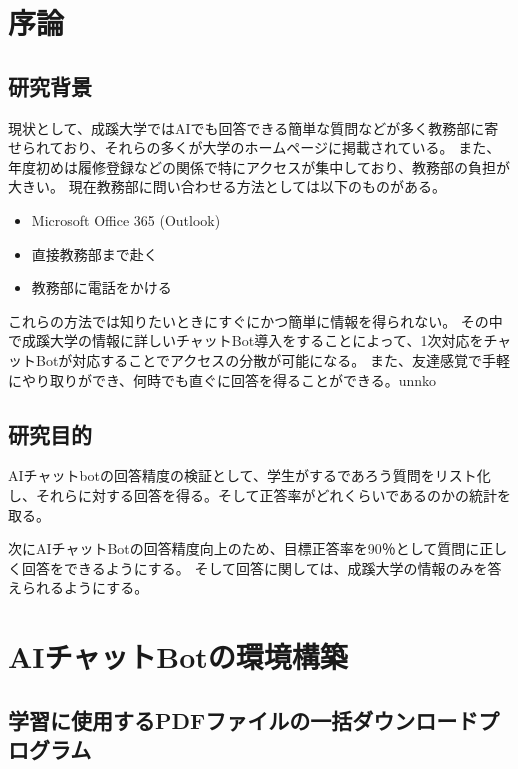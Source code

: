 \documentclass[report]{jlreq}
\begin{document}
	\chapter{序論}
		\section{研究背景}
			現状として、成蹊大学ではAIでも回答できる簡単な質問などが多く教務部に寄せられており、それらの多くが大学のホームページに掲載されている。
			また、年度初めは履修登録などの関係で特にアクセスが集中しており、教務部の負担が大きい。
			現在教務部に問い合わせる方法としては以下のものがある。
			\begin{itemize}
				\item Microsoft Office 365 (Outlook)
				\item 直接教務部まで赴く
				\item 教務部に電話をかける
			\end{itemize}
			これらの方法では知りたいときにすぐにかつ簡単に情報を得られない。
			その中で成蹊大学の情報に詳しいチャットBot導入をすることによって、1次対応をチャットBotが対応することでアクセスの分散が可能になる。
			また、友達感覚で手軽にやり取りができ、何時でも直ぐに回答を得ることができる。unnko
		\section{研究目的}
			AIチャットbotの回答精度の検証として、学生がするであろう質問をリスト化し、それらに対する回答を得る。そして正答率がどれくらいであるのかの統計を取る。

			次にAIチャットBotの回答精度向上のため、目標正答率を90％として質問に正しく回答をできるようにする。
			そして回答に関しては、成蹊大学の情報のみを答えられるようにする。
	\chapter{AIチャットBotの環境構築}
		\section{学習に使用するPDFファイルの一括ダウンロードプログラム}
\end{document}

